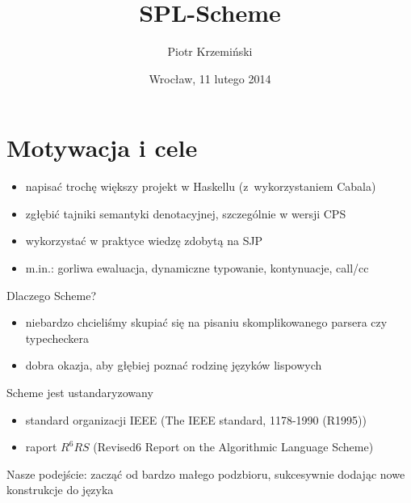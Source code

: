 \documentclass[12pt]{beamer}
\title{SPL-Scheme}
\author{Piotr Krzemiński}
\date{Wrocław, 11 lutego 2014}
\begin{document}
\begin{frame}
\titlepage
\end{frame}

\begin{frame}
\scriptsize \tableofcontents
\end{frame}

\section{Motywacja i cele}

\begin{frame}
\begin{itemize}
  \item napisać trochę większy projekt w Haskellu (z~wykorzystaniem Cabala)
  \item zgłębić tajniki semantyki denotacyjnej, szczególnie w wersji CPS
  \item wykorzystać w praktyce wiedzę zdobytą na SJP
  \item m.in.: gorliwa ewaluacja, dynamiczne typowanie, kontynuacje, call/cc
\end{itemize}
\end{frame}


\begin{frame}
Dlaczego Scheme?
\begin{itemize}
  \item niebardzo chcieliśmy skupiać się na pisaniu skomplikowanego
        parsera czy typecheckera
  \item dobra okazja, aby głębiej poznać rodzinę języków lispowych
\end{itemize}
\end{frame}


\begin{frame}
Scheme jest ustandaryzowany
\begin{itemize}
  \item standard organizacji IEEE (The IEEE standard, 1178-1990 (R1995))
  \item raport $R^6RS$ (Revised6 Report on the Algorithmic Language Scheme)
\end{itemize}
\end{frame}

\begin{frame}
\begin{center}
Nasze podejście: zacząć od bardzo małego podzbioru, sukcesywnie dodając
nowe konstrukcje do języka
\end{center}
\end{frame}
\end{document}

